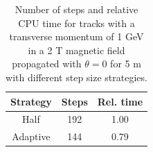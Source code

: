 
\begin{table}[ht]
    \centering
    \begin{tabular}{ccc}
        \hline
        \textbf{Strategy} & \textbf{Steps} & \textbf{Rel. time} \\
        \hline
        Half & 192 & 1.00 \\
        Adaptive & 144 & 0.79 \\
        \hline
    \end{tabular}
    \caption{Number of steps and relative CPU time for tracks with a transverse momentum of 1 GeV in a 2 T magnetic field propagated with $\theta=0$ for 5 m with different step size strategies.}
    \label{tab:dev/stepper/adaptive-step-size}
\end{table}
